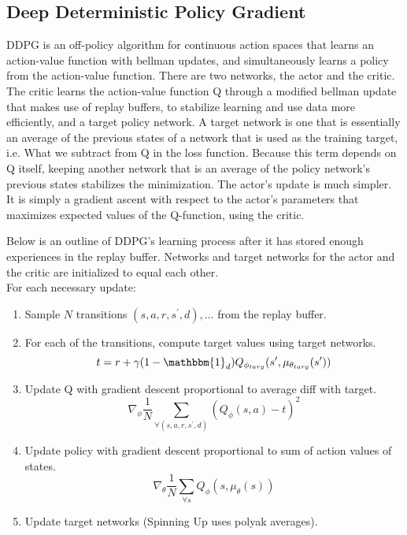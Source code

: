 \subsection{Deep Deterministic Policy Gradient}

DDPG is an off-policy algorithm for continuous action spaces that learns an action-value function with bellman updates, and simultaneously learns a policy from the action-value function. There are two networks, the actor and the critic. The critic learns the action-value function Q through a modified bellman update that makes use of replay buffers, to stabilize learning and use data more efficiently, and a target policy network. A target network is one that is essentially an average of the previous states of a network that is used as the training target, i.e. What we subtract from Q in the loss function. Because this term depends on Q itself, keeping another network that is an average of the policy network's previous states stabilizes the minimization. The actor's update is much simpler. It is simply a gradient ascent with respect to the actor's parameters that maximizes expected values of the Q-function, using the critic.

Below is an outline of DDPG's learning process after it has stored enough experiences in the replay buffer. Networks and target networks for the actor and the critic are initialized to equal each other. \\

\noindent For each necessary update:
\begin{enumerate}
    \item Sample $N$ transitions ${(s, a, r, s^\prime, d), ... }$ from the replay buffer.
    \item For each of the transitions, compute target values using target networks.
    \[ t = r + \gamma (1 - \mathbbm{1}_d) Q_{\phi_{targ}}(s^\prime,\mu_{\theta_{targ}}(s^\prime)) \]
    \item Update Q with gradient descent proportional to average diff with target.
    \[ \nabla_{\phi} \frac{1}{N} \sum_{\forall(s, a, r, s^\prime, d)} (Q_{\phi}(s, a) - t)^2\]
    \item Update policy with gradient descent proportional to sum of action values of states.
    \[ \nabla_{\theta} \frac{1}{N} \sum_{\forall s} Q_{\phi}(s, \mu_{\theta}(s))\]
    \item Update target networks (Spinning Up uses polyak averages).
\end{enumerate}

